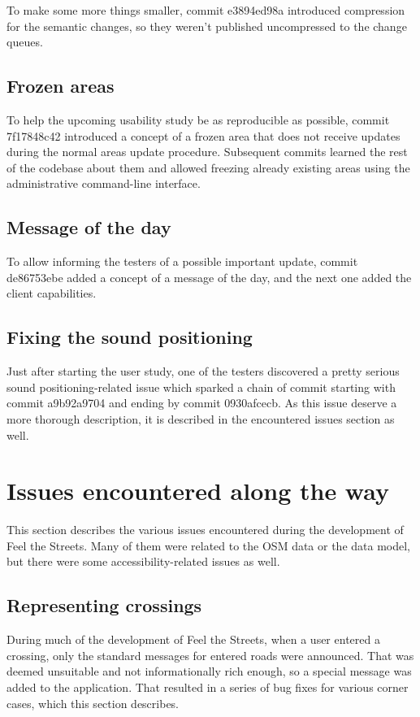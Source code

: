 \documentclass[nolof,digital]{fithesis3}
\begin{document}
To make some more things smaller, commit e3894ed98a introduced compression for the semantic changes, so they weren't published uncompressed to the change queues.
\subsection{Frozen areas}
To help the upcoming usability study be as reproducible as possible, commit 7f17848c42 introduced a concept of a frozen area that does not receive updates during the normal areas update procedure. Subsequent commits learned the rest of the codebase about them and allowed freezing already existing areas using the administrative command-line interface.
\subsection{Message of the day}
To allow informing the testers of a possible important update, commit de86753ebe added a concept of a message of the day, and the next one added the client capabilities.
\subsection{Fixing the sound positioning}
Just after starting the user study, one of the testers discovered a pretty serious sound positioning-related issue which sparked a chain of commit starting with commit a9b92a9704 and ending by commit 0930afcecb. As this issue deserve a more thorough description, it is described in the encountered issues section as well.
\section{Issues encountered along the way}
This section describes the various issues encountered during the development of Feel the Streets. Many of them were related to the OSM data or the data model, but there were some accessibility-related issues as well.
\subsection{Representing crossings} \label{ref:crossings}
During much of the development of Feel the Streets, when a user entered a crossing, only the standard messages for entered roads were announced. That was deemed unsuitable and not informationally rich enough, so a special message was added to the application. That resulted in a series of bug fixes for various corner cases, which this section describes.
\end{document}
